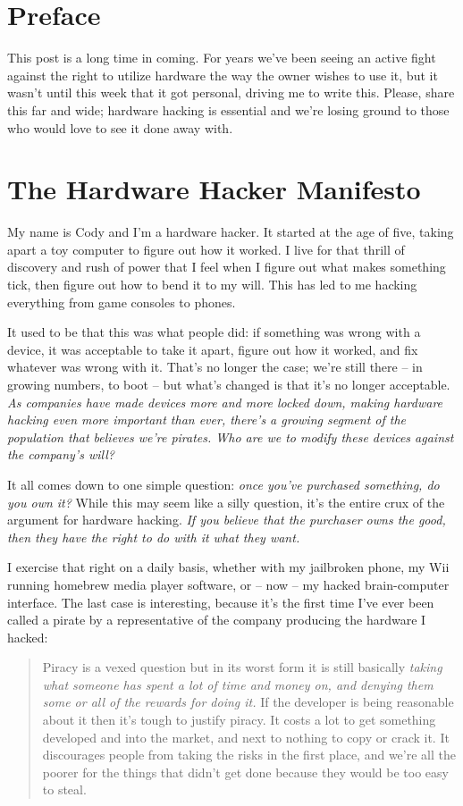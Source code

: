 \documentclass[letterpaper,12pt,english]{sphinxmanual}
\begin{document}
\section{Preface}
\label{hardware-hacker:preface}
This post is a long time in coming. For years we've been seeing an active fight against the right to utilize hardware the way the owner wishes to use it, but it wasn't until this week that it got personal, driving me to write this. Please, share this far and wide; hardware hacking is essential and we're losing ground to those who would love to see it done away with.


\section{The Hardware Hacker Manifesto}
\label{hardware-hacker:the-hardware-hacker-manifesto}
My name is Cody and I'm a hardware hacker. It started at the age of five, taking apart a toy computer to figure out how it worked. I live for that thrill of discovery and rush of power that I feel when I figure out what makes something tick, then figure out how to bend it to my will. This has led to me hacking everything from game consoles to phones.

It used to be that this was what people did: if something was wrong with a device, it was acceptable to take it apart, figure out how it worked, and fix whatever was wrong with it. That's no longer the case; we're still there -- in growing numbers, to boot -- but what's changed is that it's no longer acceptable. \emph{As companies have made devices more and more locked down, making hardware hacking even more important than ever, there's a growing segment of the population that believes we're pirates. Who are we to modify these devices against the company's will?}

It all comes down to one simple question: \emph{once you've purchased something, do you own it?} While this may seem like a silly question, it's the entire crux of the argument for hardware hacking. \emph{If you believe that the purchaser owns the good, then they have the right to do with it what they want.}

I exercise that right on a daily basis, whether with my jailbroken phone, my Wii running homebrew media player software, or -- now -- my hacked brain-computer interface. The last case is interesting, because it's the first time I've ever been called a pirate by a representative of the company producing the hardware I hacked:
\begin{quote}

Piracy is a vexed question but in its worst form it is still basically \emph{taking what someone has spent a lot of time and money on, and denying them some or all of the rewards for doing it.} If the developer is being reasonable about it then it's tough to justify piracy. It costs a lot to get something developed and into the market, and next to nothing to copy or crack it. It discourages people from taking the risks in the first place, and we're all the poorer for the things that didn't get done because they would be too easy to steal.
\end{quote}
\end{document}
